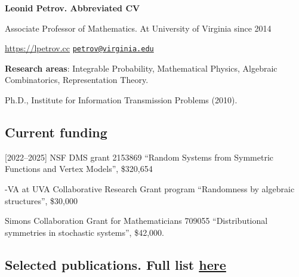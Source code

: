 \documentclass[letterpaper,11pt]{article}
\def\name{Leonid Petrov}
\begin{document}
\centerline{\huge \bf \name . Abbreviated CV}
\bigskip


Associate Professor of Mathematics. At University of Virginia since 2014

\url{https://lpetrov.cc}\hspace{140pt} \href{mailto:petrov@virginia.edu}{\tt petrov@virginia.edu}


\medskip
\textbf{Research areas}: Integrable Probability, Mathematical Physics, Algebraic Combinatorics, Representation
Theory.

\smallskip
Ph.D., 
Institute for Information Transmission Problems (2010).


\subsection*{Current funding}

[2022--2025]
NSF DMS grant 2153869 
``Random Systems from Symmetric Functions and Vertex Models'',
\$320,654

-VA at UVA Collaborative Research Grant program
	``Randomness by algebraic structures'',
	\$30,000

	\smallskip
	 [2020--2025]
		Simons Collaboration Grant for Mathematicians 709055
		``Distributional symmetries in stochastic systems'',
		\$42,000.


\subsection*{Selected publications. Full list \href{https://lpetrov.cc/research/}{here}}
\end{document}
